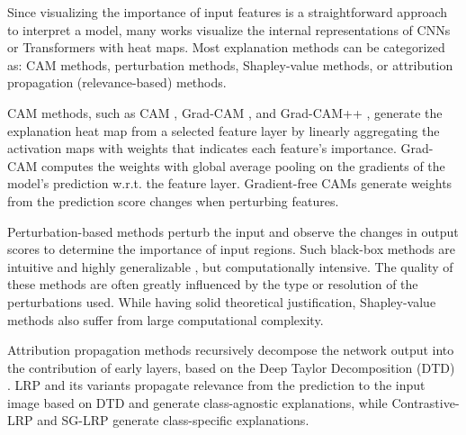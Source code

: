 Since visualizing the importance of input features is a straightforward approach to interpret a model, many works visualize the internal representations of CNNs or Transformers with heat maps. Most explanation methods can be categorized as: CAM methods, perturbation methods, Shapley-value methods, or attribution propagation (relevance-based) methods.

CAM methods, such as CAM \cite{zeiler2014visualizing}, Grad-CAM \cite{selvaraju2017grad}, and Grad-CAM++ \cite{chattopadhay2018grad}, generate the explanation heat map from a selected  feature layer by linearly aggregating the activation maps with weights that indicates each feature's importance. Grad-CAM computes the weights with global average pooling on the gradients of the model's prediction w.r.t. the feature layer. Gradient-free CAMs \cite{ramaswamy2020ablation, wang2020score, wang2020ss} generate weights from the prediction score changes when perturbing features.

Perturbation-based methods \cite{ribeiro2016should, petsiuk2018rise,fong2017interpretable, lundberg2017unified, wagner2019interpretable, lee2021bbam, petsiuk2021black} perturb the  input and observe the changes in output scores to determine the importance of input regions. Such black-box methods are intuitive and highly generalizable , but computationally intensive. The quality of these methods are often greatly influenced by the type or resolution of the perturbations used.
While having solid theoretical justification, Shapley-value methods \cite{lundberg2017unified} also suffer from large computational complexity. 

Attribution propagation methods recursively decompose the network output into the contribution of early layers, based on the Deep Taylor Decomposition (DTD) \cite{montavon2017explaining}. LRP \cite{bach2015pixel} and its variants \cite{lundberg2017unified,nam2020relative,shrikumar2017learning} propagate relevance from the prediction to the input image based on  DTD and generate class-agnostic explanations, while Contrastive-LRP \cite{gu2019understanding} and SG-LRP \cite{iwana2019explaining} generate class-specific explanations.

